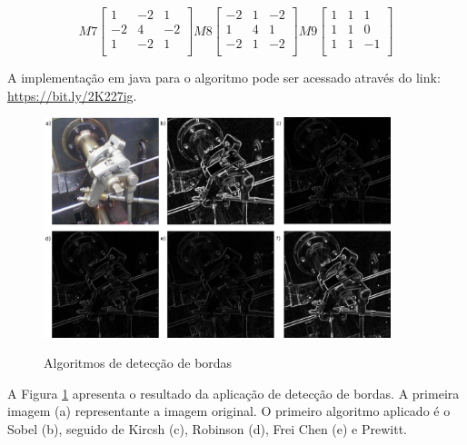 \documentclass[
	12pt,				%
	oneside,			%
	a4paper,			%
	english,			%
	french,				%
	spanish,			%
	brazil,				%
	]{abntex2}
\begin{document}
\[
M7
\begin{bmatrix}
            1 &            -2 &  1           \\ 
	       -2 &             4 & -2           \\ 
	        1 &            -2 &  1           \\ 
\end{bmatrix} 
M8
\begin{bmatrix}
           -2 &             1 & -2            \\
	        1 &             4 &  1            \\
	       -2 &             1 & -2            \\
\end{bmatrix}
M9
\begin{bmatrix}
     	 	 1 &             1 &  1           \\
	         1 &             1 &  0           \\
	         1 &             1 & -1           \\
\end{bmatrix} 
\]

A implementação em java para o algoritmo pode ser acessado através do link: \url{https://bit.ly/2K227ig}.

\begin{figure}[ht]
\centering
\caption{Algoritmos de detecção de bordas}
\includegraphics[width=0.9\textwidth]{imagens/deteccao_bordas.png}
\sourceAuthor
\label{fig:deteccao_bordas}
\end{figure}

A Figura \ref{fig:deteccao_bordas} apresenta o resultado da aplicação de detecção de bordas. A primeira imagem (a) representante a imagem original. O primeiro algoritmo aplicado é o Sobel (b), seguido de Kircsh (c), Robinson (d), Frei Chen (e) e Prewitt.
\end{document}
